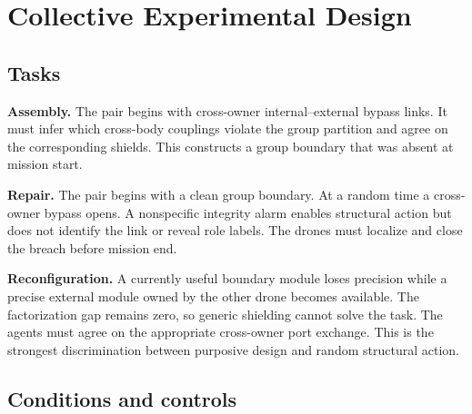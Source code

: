 \documentclass[11pt,a4paper]{article}
\numberwithin{equation}{section}
\begin{document}
\section{Collective Experimental Design}

\subsection{Tasks}

\textbf{Assembly.} The pair begins with cross-owner internal--external bypass
links. It must infer which cross-body couplings violate the group partition
and agree on the corresponding shields. This constructs a group boundary that
was absent at mission start.

\textbf{Repair.} The pair begins with a clean group boundary. At a random time
a cross-owner bypass opens. A nonspecific integrity alarm enables structural
action but does not identify the link or reveal role labels. The drones must
localize and close the breach before mission end.

\textbf{Reconfiguration.} A currently useful boundary module loses precision
while a precise external module owned by the other drone becomes available.
The factorization gap remains zero, so generic shielding cannot solve the
task. The agents must agree on the appropriate cross-owner port exchange.
This is the strongest discrimination between purposive design and random
structural action.

\subsection{Conditions and controls}
\end{document}

